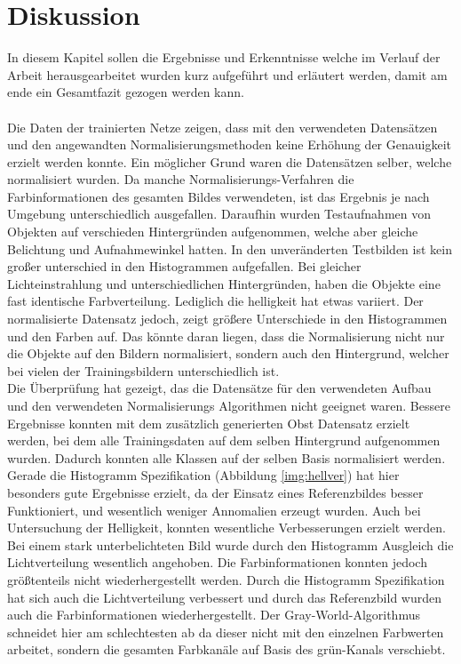 \documentclass[a4paper,12pt,oneside]{article}
\begin{document}
\section{Diskussion}\label{s.diskussion}
In diesem Kapitel sollen die Ergebnisse und Erkenntnisse welche im Verlauf der Arbeit herausgearbeitet wurden kurz aufgeführt und erläutert werden, damit am ende ein Gesamtfazit gezogen werden kann.\\\\
Die Daten der trainierten Netze zeigen, dass mit den verwendeten Datensätzen und den angewandten Normalisierungsmethoden keine Erhöhung der Genauigkeit erzielt werden konnte. Ein möglicher Grund waren die Datensätzen selber, welche normalisiert wurden. Da manche Normalisierungs-Verfahren die Farbinformationen des gesamten Bildes verwendeten, ist das Ergebnis je nach Umgebung unterschiedlich ausgefallen.
Daraufhin wurden Testaufnahmen von Objekten auf verschieden Hintergründen aufgenommen, welche aber gleiche Belichtung und Aufnahmewinkel hatten. In den unveränderten Testbilden ist kein großer unterschied in den Histogrammen aufgefallen. Bei gleicher Lichteinstrahlung und unterschiedlichen Hintergründen, haben die Objekte eine fast identische Farbverteilung. Lediglich die helligkeit hat etwas variiert. Der normalisierte Datensatz jedoch, zeigt größere Unterschiede in den Histogrammen und den Farben auf. Das könnte daran liegen, dass die Normalisierung nicht nur die Objekte auf den Bildern normalisiert, sondern auch den Hintergrund, welcher bei vielen der Trainingsbildern unterschiedlich ist.\\ 
Die Überprüfung hat gezeigt, das die Datensätze für den verwendeten Aufbau und den verwendeten Normalisierungs Algorithmen nicht geeignet waren. Bessere Ergebnisse konnten mit dem zusätzlich generierten Obst Datensatz erzielt werden, bei dem alle Trainingsdaten auf dem selben Hintergrund aufgenommen wurden. Dadurch konnten alle Klassen auf der selben Basis normalisiert werden. Gerade die Histogramm Spezifikation (Abbildung \ref{img:hellver}) hat hier besonders gute Ergebnisse erzielt, da der Einsatz eines Referenzbildes besser Funktioniert, und wesentlich weniger Annomalien erzeugt wurden. Auch bei Untersuchung der Helligkeit, konnten wesentliche Verbesserungen erzielt werden. Bei einem stark unterbelichteten Bild wurde durch den Histogramm Ausgleich die Lichtverteilung wesentlich angehoben. Die Farbinformationen konnten jedoch größtenteils nicht wiederhergestellt werden. Durch die Histogramm Spezifikation hat sich auch die Lichtverteilung verbessert und durch das Referenzbild wurden auch die Farbinformationen wiederhergestellt. Der Gray-World-Algorithmus schneidet hier am schlechtesten ab da dieser nicht mit den einzelnen Farbwerten arbeitet, sondern die gesamten Farbkanäle auf Basis des grün-Kanals verschiebt. 
\end{document}
